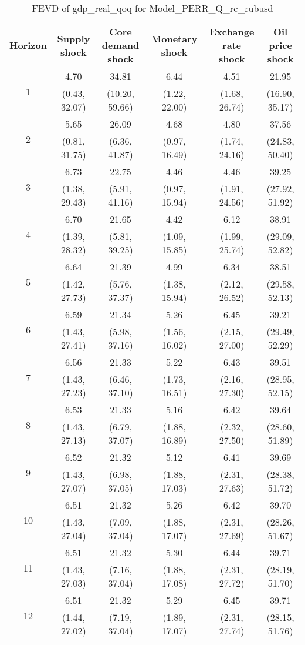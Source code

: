 \documentclass{article}
\begin{document}
\begin{table}
	\footnotesize
	\caption{FEVD of gdp_real_qoq for Model_PERR_Q_rc_rubusd}
	\begin{tabular}{cccccc}
		Horizon & Supply shock & Core demand shock & Monetary shock & Exchange rate shock & Oil price shock\\ \hline
		\multirow{2}{*}{1} & 4.70 & 34.81 & 6.44 & 4.51 & 21.95\\
		 & (0.43, 32.07) & (10.20, 59.66) & (1.22, 22.00) & (1.68, 26.74) & (16.90, 35.17)\\
		\multirow{2}{*}{2} & 5.65 & 26.09 & 4.68 & 4.80 & 37.56\\
		 & (0.81, 31.75) & (6.36, 41.87) & (0.97, 16.49) & (1.74, 24.16) & (24.83, 50.40)\\
		\multirow{2}{*}{3} & 6.73 & 22.75 & 4.46 & 4.46 & 39.25\\
		 & (1.38, 29.43) & (5.91, 41.16) & (0.97, 15.94) & (1.91, 24.56) & (27.92, 51.92)\\
		\multirow{2}{*}{4} & 6.70 & 21.65 & 4.42 & 6.12 & 38.91\\
		 & (1.39, 28.32) & (5.81, 39.25) & (1.09, 15.85) & (1.99, 25.74) & (29.09, 52.82)\\
		\multirow{2}{*}{5} & 6.64 & 21.39 & 4.99 & 6.34 & 38.51\\
		 & (1.42, 27.73) & (5.76, 37.37) & (1.38, 15.94) & (2.12, 26.52) & (29.58, 52.13)\\
		\multirow{2}{*}{6} & 6.59 & 21.34 & 5.26 & 6.45 & 39.21\\
		 & (1.43, 27.41) & (5.98, 37.16) & (1.56, 16.02) & (2.15, 27.00) & (29.49, 52.29)\\
		\multirow{2}{*}{7} & 6.56 & 21.33 & 5.22 & 6.43 & 39.51\\
		 & (1.43, 27.23) & (6.46, 37.10) & (1.73, 16.51) & (2.16, 27.30) & (28.95, 52.15)\\
		\multirow{2}{*}{8} & 6.53 & 21.33 & 5.16 & 6.42 & 39.64\\
		 & (1.43, 27.13) & (6.79, 37.07) & (1.88, 16.89) & (2.32, 27.50) & (28.60, 51.89)\\
		\multirow{2}{*}{9} & 6.52 & 21.32 & 5.12 & 6.41 & 39.69\\
		 & (1.43, 27.07) & (6.98, 37.05) & (1.88, 17.03) & (2.31, 27.63) & (28.38, 51.72)\\
		\multirow{2}{*}{10} & 6.51 & 21.32 & 5.26 & 6.42 & 39.70\\
		 & (1.43, 27.04) & (7.09, 37.04) & (1.88, 17.07) & (2.31, 27.69) & (28.26, 51.67)\\
		\multirow{2}{*}{11} & 6.51 & 21.32 & 5.30 & 6.44 & 39.71\\
		 & (1.43, 27.03) & (7.16, 37.04) & (1.88, 17.08) & (2.31, 27.72) & (28.19, 51.70)\\
		\multirow{2}{*}{12} & 6.51 & 21.32 & 5.29 & 6.45 & 39.71\\
		 & (1.44, 27.02) & (7.19, 37.04) & (1.89, 17.07) & (2.31, 27.74) & (28.15, 51.76)\\
	\end{tabular}
\label{tab:fevd-Model_PERR_Q_rc_rubusd-gdp_real_qoq}
\end{table}
\end{document}
